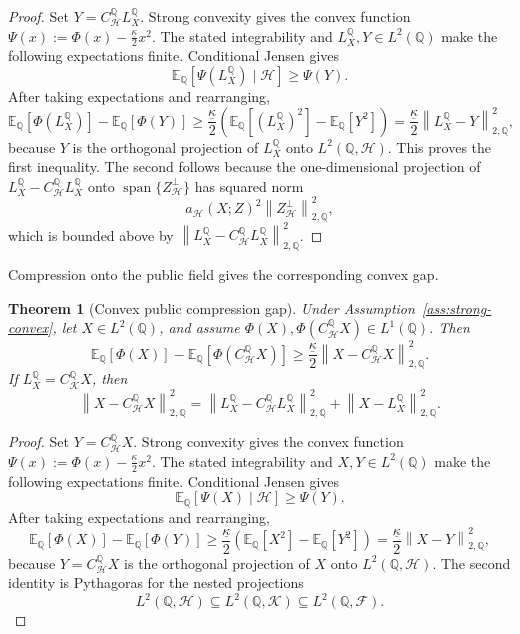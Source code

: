 \documentclass[11pt,a4paper]{amsart}
\theoremstyle{plain}
\newtheorem{theorem}{Theorem}[section]
\theoremstyle{definition}
\theoremstyle{remark}
\DeclareMathOperator{\Span}{span}
\newcommand{\QQ}{\mathbb{Q}}
\newcommand{\EE}{\mathbb{E}}
\newcommand{\cF}{\mathcal{F}}
\newcommand{\cH}{\mathcal{H}}
\newcommand{\cK}{\mathcal{K}}
\newcommand{\norm}[1]{\left\lVert #1\right\rVert}
\begin{document}
\begin{proof}
Set \(Y=C_{\cH}^{\QQ}L_X^\QQ\).  Strong convexity gives the convex function
\(\Psi(x):=\Phi(x)-\frac{\underline\kappa}{2}x^2\).  The stated integrability and
\(L_X^\QQ,Y\in L^2(\QQ)\) make the following expectations finite.  Conditional Jensen gives
\[
        \EE_\QQ[\Psi(L_X^\QQ)\mid\cH]\ge \Psi(Y).
\]
After taking expectations and rearranging,
\[
        \EE_\QQ[\Phi(L_X^\QQ)]-\EE_\QQ[\Phi(Y)]
        \ge
        \frac{\underline\kappa}{2}
        \left(\EE_\QQ[(L_X^\QQ)^2]-\EE_\QQ[Y^2]\right)
        =
        \frac{\underline\kappa}{2}\norm{L_X^\QQ-Y}_{2,\QQ}^2,
\]
because \(Y\) is the orthogonal projection of \(L_X^\QQ\) onto \(L^2(\QQ,\cH)\).  This proves the
first inequality.  The second follows because the one-dimensional projection of
\(L_X^\QQ-C_{\cH}^{\QQ}L_X^\QQ\) onto
\(\Span\{Z_{\cH}^{\perp}\}\) has squared norm
\[
        a_{\cH}(X;Z)^2\norm{Z_{\cH}^{\perp}}_{2,\QQ}^{2},
\]
which is bounded above by
\(\norm{L_X^\QQ-C_{\cH}^{\QQ}L_X^\QQ}_{2,\QQ}^{2}\).
\end{proof}

Compression onto the public field gives the corresponding convex gap.

\begin{theorem}[Convex public compression gap]\label{thm:convex-gap}
Under Assumption~\ref{ass:strong-convex}, let \(X\in L^2(\QQ)\), and assume
\(\Phi(X),\Phi(C_{\cH}^{\QQ}X)\in L^1(\QQ)\).  Then
\[
        \EE_\QQ[\Phi(X)]
        -
        \EE_\QQ[\Phi(C_{\cH}^{\QQ}X)]
        \ge
        \frac{\underline\kappa}{2}
        \norm{X-C_{\cH}^{\QQ}X}_{2,\QQ}^2.
\]
If \(L_X^\QQ=C_{\cK}^{\QQ}X\), then
\[
        \norm{X-C_{\cH}^{\QQ}X}_{2,\QQ}^2
        =
        \norm{L_X^\QQ-C_{\cH}^{\QQ}L_X^\QQ}_{2,\QQ}^2
        +
        \norm{X-L_X^\QQ}_{2,\QQ}^2.
\]
\end{theorem}

\begin{proof}
Set \(Y=C_{\cH}^{\QQ}X\).  Strong convexity gives the convex function
\(\Psi(x):=\Phi(x)-\frac{\underline\kappa}{2}x^2\).  The stated integrability and
\(X,Y\in L^2(\QQ)\) make the following expectations finite.  Conditional Jensen gives
\[
        \EE_\QQ[\Psi(X)\mid\cH]\ge \Psi(Y).
\]
After taking expectations and rearranging,
\[
        \EE_\QQ[\Phi(X)]-\EE_\QQ[\Phi(Y)]
        \ge
        \frac{\underline\kappa}{2}
        \left(\EE_\QQ[X^2]-\EE_\QQ[Y^2]\right)
        =
        \frac{\underline\kappa}{2}\norm{X-Y}_{2,\QQ}^2,
\]
because \(Y=C_{\cH}^{\QQ}X\) is the orthogonal projection of \(X\) onto
\(L^2(\QQ,\cH)\).  The second identity is Pythagoras for the nested projections
\[
        L^2(\QQ,\cH)\subseteq L^2(\QQ,\cK)\subseteq L^2(\QQ,\cF).
\]
\end{proof}
\end{document}
